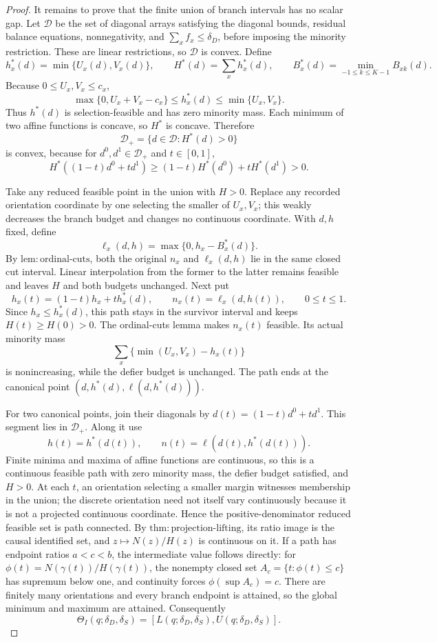 \documentclass{article}
\begin{document}
\begin{proof}
It remains to prove that the finite union of branch intervals has no scalar gap. Let \(\mathcal D\) be the set of diagonal arrays satisfying the diagonal bounds, residual balance equations, nonnegativity, and \(\sum_xf_x\leq\delta_D\), before imposing the minority restriction. These are linear restrictions, so \(\mathcal D\) is convex. Define
\[
 h_x^*(d)=\min\{U_x(d),V_x(d)\},
 \qquad H^*(d)=\sum_xh_x^*(d),
 \qquad B_x^*(d)=\min_{-1\leq k\leq K-1}B_{xk}(d).
\]
Because \(0\leq U_x,V_x\leq c_x\),
\[
 \max\{0,U_x+V_x-c_x\}\leq h_x^*(d)
 \leq\min\{U_x,V_x\}.
\]
Thus \(h^*(d)\) is selection-feasible and has zero minority mass. Each minimum of two affine functions is concave, so \(H^*\) is concave. Therefore
\[
 \mathcal D_+=\{d\in\mathcal D:H^*(d)>0\}
\]
is convex, because for \(d^0,d^1\in\mathcal D_+\) and \(t\in[0,1]\),
\[
 H^*((1-t)d^0+td^1)
 \geq(1-t)H^*(d^0)+tH^*(d^1)>0.
\]

Take any reduced feasible point in the union with \(H>0\). Replace any recorded orientation coordinate by one selecting the smaller of \(U_x,V_x\); this weakly decreases the branch budget and changes no continuous coordinate. With \(d,h\) fixed, define
\[
 \ell_x(d,h)=\max\{0,h_x-B_x^*(d)\}.
\]
By \(\mathrm{lem:ordinal\text{-}cuts}\), both the original \(n_x\) and \(\ell_x(d,h)\) lie in the same closed cut interval. Linear interpolation from the former to the latter remains feasible and leaves \(H\) and both budgets unchanged. Next put
\[
 h_x(t)=(1-t)h_x+t h_x^*(d),
 \qquad n_x(t)=\ell_x(d,h(t)),
 \qquad 0\leq t\leq1.
\]
Since \(h_x\leq h_x^*(d)\), this path stays in the survivor interval and keeps \(H(t)\geq H(0)>0\). The ordinal-cuts lemma makes \(n_x(t)\) feasible. Its actual minority mass
\[
 \sum_x\{\min(U_x,V_x)-h_x(t)\}
\]
is nonincreasing, while the defier budget is unchanged. The path ends at the canonical point \((d,h^*(d),\ell(d,h^*(d)))\).

For two canonical points, join their diagonals by \(d(t)=(1-t)d^0+td^1\). This segment lies in \(\mathcal D_+\). Along it use
\[
 h(t)=h^*(d(t)),
 \qquad n(t)=\ell(d(t),h^*(d(t))).
\]
Finite minima and maxima of affine functions are continuous, so this is a continuous feasible path with zero minority mass, the defier budget satisfied, and \(H>0\). At each \(t\), an orientation selecting a smaller margin witnesses membership in the union; the discrete orientation need not itself vary continuously because it is not a projected continuous coordinate. Hence the positive-denominator reduced feasible set is path connected. By \(\mathrm{thm:projection\text{-}lifting}\), its ratio image is the causal identified set, and \(z\mapsto N(z)/H(z)\) is continuous on it. If a path has endpoint ratios \(a<c<b\), the intermediate value follows directly: for \(\phi(t)=N(\gamma(t))/H(\gamma(t))\), the nonempty closed set \(A_c=\{t:\phi(t)\leq c\}\) has supremum below one, and continuity forces \(\phi(\sup A_c)=c\). There are finitely many orientations and every branch endpoint is attained, so the global minimum and maximum are attained. Consequently
\[
 \Theta_I(q;\delta_D,\delta_S)
 =[L(q;\delta_D,\delta_S),U(q;\delta_D,\delta_S)].
\]


\end{proof}
\end{document}
